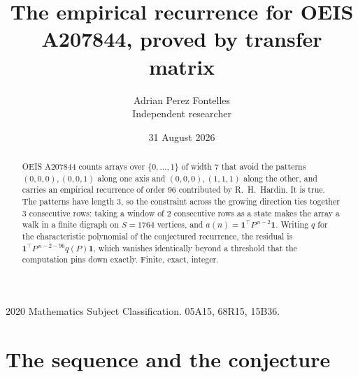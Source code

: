 \documentclass[11pt,a4paper]{article}
\title{The empirical recurrence for OEIS A207844, proved by transfer matrix}
\author{Adrian Perez Fontelles\\ \small Independent researcher}
\date{31 August 2026}
\theoremstyle{plain}
\theoremstyle{definition}
\begin{document}
\maketitle

\begin{abstract}
OEIS A207844 counts arrays over $\{0,\dots,1\}$ of width $7$ that avoid the patterns
$(0,0,0), (0,0,1)$ along one axis and $(0,0,0), (1,1,1)$ along the other, and carries an empirical recurrence of
order $96$ contributed by R.~H.~Hardin. It is true. The patterns have length $3$, so
the constraint across the growing direction ties together $3$ consecutive rows: taking a
window of $2$ consecutive rows as a state makes the array a walk in a finite digraph
on $S=1764$ vertices, and $a(n)=\mathbf{1}^{\!\top}P^{\,n-2}\mathbf{1}$. Writing $q$
for the characteristic polynomial of the conjectured recurrence, the residual is
$\mathbf{1}^{\!\top}P^{\,n-2-96}q(P)\mathbf{1}$, which vanishes identically
beyond a threshold that the computation pins down exactly. Finite, exact, integer.
\end{abstract}

\noindent\small 2020 Mathematics Subject Classification. 05A15, 68R15, 15B36.\normalsize

\section{The sequence and the conjecture}
\end{document}
